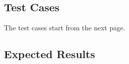 
%

\subsection{Test Cases}

The test cases start from the next page.



\subsection{Expected Results}

\begingroup
\fontsize{6pt}{8pt}\selectfont
